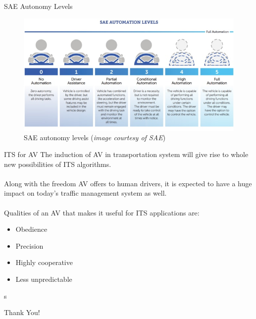 \documentclass{beamer}
\begin{document}
\begin{frame}{SAE Autonomy Levels}
	\begin{figure}
		\centering
		\includegraphics[width = \textwidth]{figures/SAE levels image coutsey_SAE}
		\caption{SAE autonomy levels (\textit{image courtesy of SAE})}
		\label{saelevels}
	\end{figure}
\end{frame}

\begin{frame}{ITS for AV}
	The induction of AV in transportation system will give rise to whole new possibilities of ITS algorithms.\\~\\
	Along with the freedom AV offers to human drivers, it is expected to have a huge impact on today's traffic management system as well. \\~\\
	Qualities of an AV that makes it useful for ITS applications are:
	\begin{itemize}
		\item Obedience
		\item Precision
		\item Highly cooperative
		\item Less unpredictable
	\end{itemize}
\end{frame}


\begin{frame}s
	\begin{center}
		\Huge Thank You!
	\end{center}
\end{frame}
\end{document}
